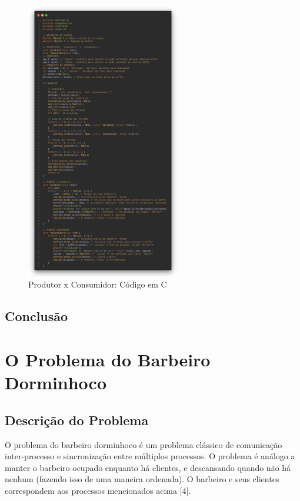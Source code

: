 \documentclass[
	12pt,				%
	openright,			%
	oneside,			%
	a4paper,			%
	chapter=TITLE,		%
	english,			%
	french,				%
	spanish,			%
	brazil				%
	]{abntex2}
\theoremstyle{definition}
\begin{document}
\begin{figure}[h]
    \centering
    \includegraphics[width=0.6\textwidth]{imagens/prod_cons.png}
    \caption{Produtor x Consumidor: Código em C}
    \label{fig:prod_cons}
\end{figure}

\clearpage
\section{Conclusão}

\chapter{O Problema do Barbeiro Dorminhoco}
\section{Descrição do Problema}
O problema do barbeiro dorminhoco é um problema clássico de comunicação inter-processo e sincronização entre múltiplos processos. O problema é análogo a manter o barbeiro ocupado enquanto há clientes, e descansando quando não há nenhum (fazendo isso de uma maneira ordenada). O barbeiro e seus clientes correspondem aos processos mencionados acima [4]. 
\end{document}
